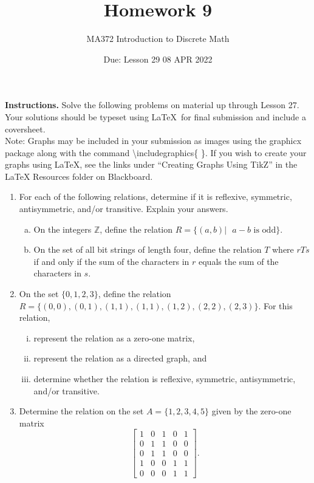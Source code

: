 \documentclass{article}
\title{Homework 9}
\author{MA372 Introduction to Discrete Math}
\date{Due: Lesson 29 08 APR 2022}
\begin{document}
\maketitle 

\textbf{Instructions.} Solve the following problems on material up through Lesson 27. Your solutions should be typeset using \LaTeX\, for final submission and include a coversheet.\\

Note: Graphs may be included in your submission as images using the graphicx package along with the command \textbackslash includegraphics\{ \}. If you wish to create your graphs using \LaTeX, see the links under ``Creating Graphs Using TikZ'' in the LaTeX Resources folder on Blackboard.

\begin{enumerate}
	\item For each of the following relations, determine if it is reflexive, symmetric, antisymmetric, and/or transitive. Explain your answers.
	\begin{enumerate}[a)]
		\item On the integers $\mathbb{Z}$, define the relation $R=\{(a,b)|\text{ }a-b\text{ is odd}\}$.
		\item On the set of all bit strings of length four, define the relation $T$ where $rTs$ if and only if the sum of the characters in $r$ equals the sum of the characters in $s$.
	\end{enumerate}
	
	\item On the set $\{0,1,2,3\}$, define the relation $R=\{(0,0),(0,1),(1,1),(1,1),(1,2),(2,2),(2,3)\}$. For this relation,
	\begin{enumerate}[i.]
		\item represent the relation as a zero-one matrix,
		\item represent the relation as a directed graph, and
		\item determine whether the relation is reflexive, symmetric, antisymmetric, and/or transitive.
	\end{enumerate}
	
	\item Determine the relation on the set $A=\{1,2,3,4,5\}$ given by the zero-one matrix
	\[\begin{bmatrix}
			1 & 0 & 1 & 0 & 1\\0 & 1 & 1 & 0 & 0\\0 & 1 & 1 & 0 & 0\\1 & 0 & 0 & 1 & 1\\0 & 0 & 0 & 1 & 1
		\end{bmatrix}.\]


\end{enumerate}
\end{document}
